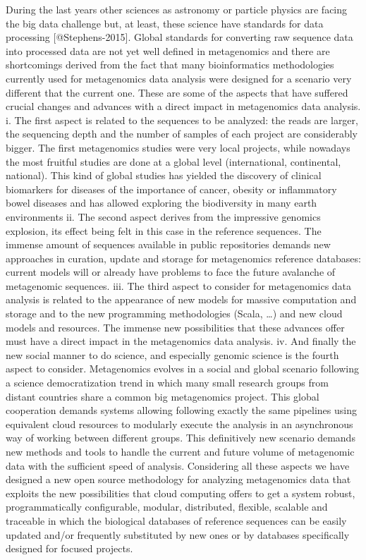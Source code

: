 \documentclass{frontiersSCNS} %
\begin{document}
During the last years other sciences as astronomy or particle physics
are facing the big data challenge but, at least, these science have
standards for data processing {[}@Stephens-2015{]}. Global standards for
converting raw sequence data into processed data are not yet well
defined in metagenomics and there are shortcomings derived from the fact
that many bioinformatics methodologies currently used for metagenomics
data analysis were designed for a scenario very different that the
current one. These are some of the aspects that have suffered crucial
changes and advances with a direct impact in metagenomics data analysis.
i. The first aspect is related to the sequences to be analyzed: the
reads are larger, the sequencing depth and the number of samples of each
project are considerably bigger. The first metagenomics studies were
very local projects, while nowadays the most fruitful studies are done
at a global level (international, continental, national). This kind of
global studies has yielded the discovery of clinical biomarkers for
diseases of the importance of cancer, obesity or inflammatory bowel
diseases and has allowed exploring the biodiversity in many earth
environments ii. The second aspect derives from the impressive genomics
explosion, its effect being felt in this case in the reference
sequences. The immense amount of sequences available in public
repositories demands new approaches in curation, update and storage for
metagenomics reference databases: current models will or already have
problems to face the future avalanche of metagenomic sequences. iii. The
third aspect to consider for metagenomics data analysis is related to
the appearance of new models for massive computation and storage and to
the new programming methodologies (Scala, \ldots{}) and new cloud models
and resources. The immense new possibilities that these advances offer
must have a direct impact in the metagenomics data analysis. iv. And
finally the new social manner to do science, and especially genomic
science is the fourth aspect to consider. Metagenomics evolves in a
social and global scenario following a science democratization trend in
which many small research groups from distant countries share a common
big metagenomics project. This global cooperation demands systems
allowing following exactly the same pipelines using equivalent cloud
resources to modularly execute the analysis in an asynchronous way of
working between different groups. This definitively new scenario demands
new methods and tools to handle the current and future volume of
metagenomic data with the sufficient speed of analysis. Considering all
these aspects we have designed a new open source methodology for
analyzing metagenomics data that exploits the new possibilities that
cloud computing offers to get a system robust, programmatically
configurable, modular, distributed, flexible, scalable and traceable in
which the biological databases of reference sequences can be easily
updated and/or frequently substituted by new ones or by databases
specifically designed for focused projects.
\end{document}
